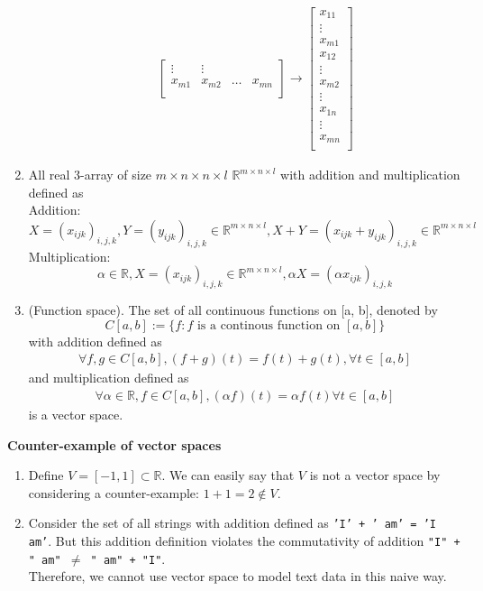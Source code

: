 \documentclass[11pt]{article}
\newcommand{\R}{\mathbb{R}}
\begin{document}
\begin{enumerate}
\begin{enumerate}
\begin{align*}
\begin{bmatrix}
\vdots & \vdots& \\
x_{m1} & x_{m2}& \dots& x_{mn}\\
\end{bmatrix} \rightarrow \begin{bmatrix}
x_{11}\\
\vdots\\
x_{m1}\\
x_{12}\\
\vdots\\
x_{m2}\\
\vdots\\
x_{1n}\\
\vdots\\
x_{mn}\\
\end{bmatrix}
\end{align*}
\end{enumerate}
\item All real 3-array of size $m \times n \times n \times l$ $\R^{m \times n \times l}$ with addition and multiplication defined as\\
Addition: $$X = (x_{ijk})_{i, j, k}, Y = (y_{ijk})_{i, j, k} \in \R^{m \times n \times l}, X+Y = (x_{ijk} + y_{ijk})_{i, j, k} \in \R^{m \times n \times l}$$
Multiplication: $$\alpha \in \mathbb{R}, X = (x_{ijk})_{i, j, k} \in \R^{m \times n \times l}, \alpha X = (\alpha x_{ijk})_{i, j, k}$$
\item (Function space). The set of all continuous functions on [a, b], denoted by $$C[a, b] := \{ f : f \text{ is a continous function on } [a, b]\}$$ with addition defined as \begin{align*}
\forall f, g \in C[a, b], (f+g)(t) = f(t) + g(t) , \forall t \in [a, b]
\end{align*} and multiplication defined as \begin{align*}
\forall \alpha \in \R, f \in C[a, b], (\alpha f)(t) = \alpha f(t) \forall t \in [a, b]
\end{align*} is a vector space.
\end{enumerate}
\textbf{Counter-example of vector spaces}
\begin{enumerate}
\item Define $V = [-1, 1] \subset \R$. We can easily say that $V$ is not a vector space by considering a counter-example: $1+1 = 2 \notin V$.
\item Consider the set of all strings with addition defined as \texttt{'I' + ' am' = 'I am'}.  But this addition definition violates the commutativity of addition \texttt{"I" + " am" $\neq$ " am" + "I"}. \\ Therefore, we cannot use vector space to model text data in this naive way.
\end{enumerate}
\end{document}
